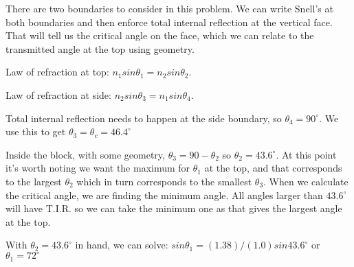 \documentclass[10pt]{article}
\newenvironment{problem}[2][Problem]{\begin{trivlist}
\item[\hskip \labelsep {\bfseries #1}\hskip \labelsep {\bfseries #2.}]}{\end{trivlist}}
\begin{document}
\begin{problem}{3}
There are two boundaries to consider in this problem. We can write Snell's at both boundaries and then enforce total internal reflection at the vertical face. That will tell us the critical angle on the face, which we can relate to the transmitted angle at the top using geometry. 
\item Law of refraction at top: $n_1sin\theta_1=n_2sin\theta_2$.
\item Law of refraction at side: $n_2sin\theta_3=n_1sin\theta_4$.
\item Total internal reflection needs to happen at the side boundary, so $\theta_4=90^\circ$. We use this to get $\theta_3=\theta_c=46.4^\circ$
\item Inside the block, with some geometry, $\theta_3=90-\theta_2$ so $\theta_2=43.6^\circ$. At this point it's worth noting we want the maximum for $\theta_1$ at the top, and that corresponds to the largest $\theta_2$ which in turn corresponds to the smallest $\theta_3$. When we calculate the critical angle, we are finding the minimum angle. All angles larger than $43.6^\circ$ will have T.I.R. so we can take the minimum one as that gives the largest angle at the top.
\item With $\theta_2=43.6^\circ$ in hand, we can solve: $sin\theta_1=(1.38)/(1.0)sin43.6^\circ$ or $\theta_1=72^\circ$

\end{problem}






\end{document}
